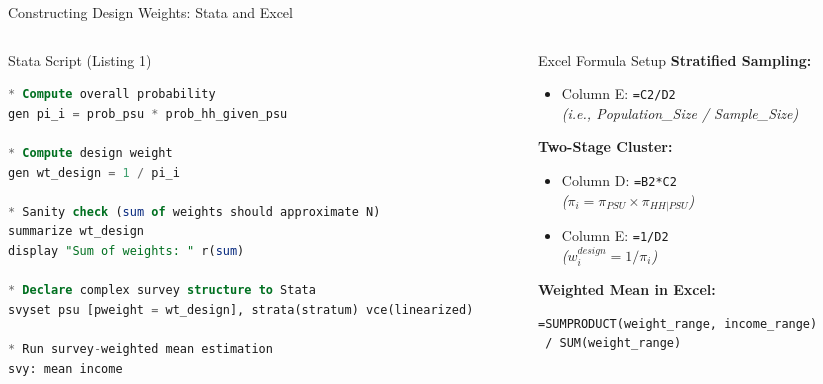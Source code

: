\documentclass[10pt, aspectratio=169]{beamer}
\begin{document}
\begin{frame}[fragile]{Constructing Design Weights: Stata and Excel}
  \begin{columns}[T]
    \begin{column}{0.55\textwidth}
      \begin{block}{Stata Script (Listing 1)}
\begin{lstlisting}[language=SQL]
* Compute overall probability
gen pi_i = prob_psu * prob_hh_given_psu

* Compute design weight
gen wt_design = 1 / pi_i

* Sanity check (sum of weights should approximate N)
summarize wt_design
display "Sum of weights: " r(sum)

* Declare complex survey structure to Stata
svyset psu [pweight = wt_design], strata(stratum) vce(linearized)

* Run survey-weighted mean estimation
svy: mean income
\end{lstlisting}
      \end{block}
    \end{column}
    \begin{column}{0.42\textwidth}
      \begin{block}{Excel Formula Setup}
        \textbf{Stratified Sampling:}
        \begin{itemize}
          \item Column E: \texttt{=C2/D2} \\ \textit{(i.e., Population\_Size / Sample\_Size)}
        \end{itemize}
        \textbf{Two-Stage Cluster:}
        \begin{itemize}
          \item Column D: \texttt{=B2*C2} \\ \textit{($\pi_i = \pi_{PSU} \times \pi_{HH|PSU}$)}
          \item Column E: \texttt{=1/D2} \\ \textit{($w_i^{design} = 1/\pi_i$)}
        \end{itemize}
        \textbf{Weighted Mean in Excel:}
        \begin{lstlisting}[backgroundcolor=\color{white}, frame=none, basicstyle=\ttfamily\scriptsize]
=SUMPRODUCT(weight_range, income_range) 
 / SUM(weight_range)
        \end{lstlisting}
      \end{block}
    \end{column}
  \end{columns}
\end{frame}
\end{document}
